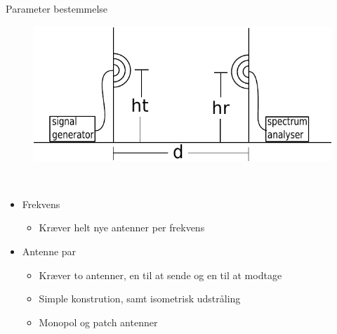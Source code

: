 \begin{frame}{Parameter bestemmelse}
\begin{figure}[!htbp]
	\centering
	\includegraphics[width = 0.8\columnwidth]{figures/setup.pdf}
\end{figure}
\begin{minipage}{0.15\textwidth}
 \textcolor{white}{.}  
\end{minipage}%
\begin{minipage}{0.8\textwidth}
\begin{itemize}
\item Frekvens
\begin{itemize}
\item Kræver helt nye antenner per frekvens
\end{itemize}
\item Antenne par
\begin{itemize}

\item Kræver to antenner, en til at sende og en til at modtage
\item Simple konstrution, samt isometrisk udstråling
\item Monopol og patch antenner

\end{itemize}
\end{itemize}
\end{minipage}
\end{frame}

